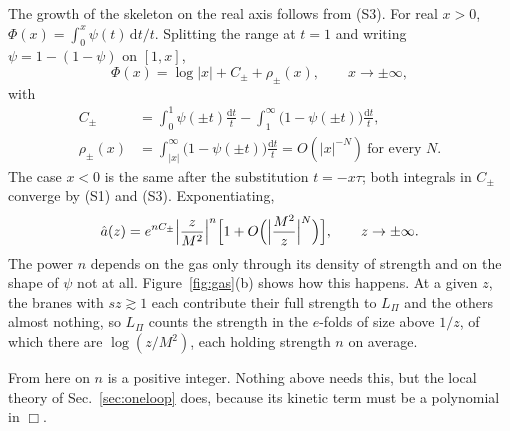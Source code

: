 \documentclass[aps,prd,10pt,twocolumn,superscriptaddress,nofootinbib,floatfix,longbibliography]{revtex4-2}
\newcommand{\dd}{\mathrm{d}}
\begin{document}
The growth of the skeleton on the real axis follows from (S3). For real $x>0$, $\Phi(x)=\int_0^x\psi(t)\,\dd t/t$. Splitting the range at $t=1$ and writing $\psi=1-(1-\psi)$ on $[1,x]$,
\begin{equation}
\label{eq:Phi-asym}
\Phi(x)=\log|x|+C_\pm+\rho_\pm(x),\qquad x\to\pm\infty,
\end{equation}
with
\begin{align*}
C_\pm&=\int_0^1\psi(\pm t)\frac{\dd t}t-\int_1^\infty\bigl(1-\psi(\pm t)\bigr)\frac{\dd t}t,\\
\rho_\pm(x)&=\int_{|x|}^\infty\bigl(1-\psi(\pm t)\bigr)\frac{\dd t}t=O(|x|^{-N})\ \text{for every }N.
\end{align*}
The case $x<0$ is the same after the substitution $t=-x\tau$; both integrals in $C_\pm$ converge by (S1) and (S3). Exponentiating,
\begin{equation}
\label{eq:a-asym}
\hat a(z)=e^{nC_\pm}\Bigl|\frac z{M^2}\Bigr|^{n}\Bigl[1+O\Bigl(\Bigl|\frac{M^2}{z}\Bigr|^{N}\Bigr)\Bigr],\qquad z\to\pm\infty .
\end{equation}
The power $n$ depends on the gas only through its density of strength and on the shape of $\psi$ not at all. Figure~\ref{fig:gas}(b) shows how this happens. At a given $z$, the branes with $sz\gtrsim1$ each contribute their full strength to $L_\Pi$ and the others almost nothing, so $L_\Pi$ counts the strength in the $e$-folds of size above $1/z$, of which there are $\log(z/M^2)$, each holding strength $n$ on average.

From here on $n$ is a positive integer. Nothing above needs this, but the local theory of Sec.~\ref{sec:oneloop} does, because its kinetic term must be a polynomial in $\Box$.
\end{document}
